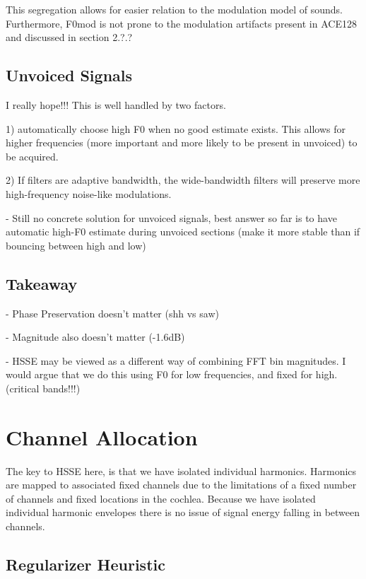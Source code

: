 \documentclass [11pt, proquest] {uwthesis}[2015/03/03]
\begin{document}
This segregation allows for easier relation to the modulation model of sounds.  Furthermore, F0mod is not prone to the modulation artifacts present in ACE128 and discussed in section 2.?.?

\subsection{Unvoiced Signals}

I really hope!!!  This is well handled by two factors.

1) automatically choose high F0 when no good estimate exists.  This allows for higher frequencies (more important and more likely to be present in unvoiced) to be acquired.

2) If filters are adaptive bandwidth, the wide-bandwidth filters will preserve more high-frequency noise-like modulations.


 - Still no concrete solution for unvoiced signals, best answer so far is to have automatic high-F0 estimate during unvoiced sections (make it more stable than if bouncing between high and low)

\subsection{Takeaway}

 - Phase Preservation doesn't matter (shh vs saw)
 
 - Magnitude also doesn't matter (-1.6dB)
 
 - HSSE may be viewed as a different way of combining FFT bin magnitudes.  I would argue that we do this using F0 for low frequencies, and fixed for high.  (critical bands!!!)

\section{Channel Allocation}

The key to HSSE here, is that we have isolated individual harmonics.  Harmonics are mapped to associated fixed channels due to the limitations of a fixed number of channels and fixed locations in the cochlea.  Because we have isolated individual harmonic envelopes there is no issue of signal energy falling in between channels.

\subsection{Regularizer Heuristic}
\end{document}
